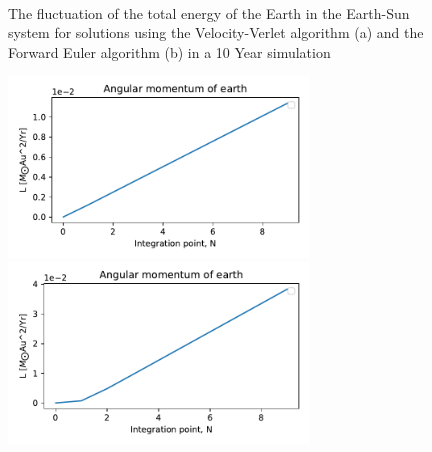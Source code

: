 \documentclass[10pt,showpacs,preprintnumbers,footinbib,amsmath,amssymb,aps,prl,twocolumn,groupedaddress,superscriptaddress,showkeys]{revtex4-1}
\begin{document}
\begin{figure}
  \center
  \\
   \caption{The fluctuation of the total energy of the Earth in the Earth-Sun system for solutions using the Velocity-Verlet algorithm (a) and the Forward Euler algorithm (b) in a 10 Year simulation}
   \label{fig:c_energy}
\end{figure}

\begin{figure}
  \center
  \includegraphics[width=8cm]{figs/ex_b_angularmomentum_velocityverlet_1.pdf}
  \includegraphics[width=8cm]{figs/ex_b_angularmomentum_eulerforward_1.pdf}
\end{figure}
\end{document}
